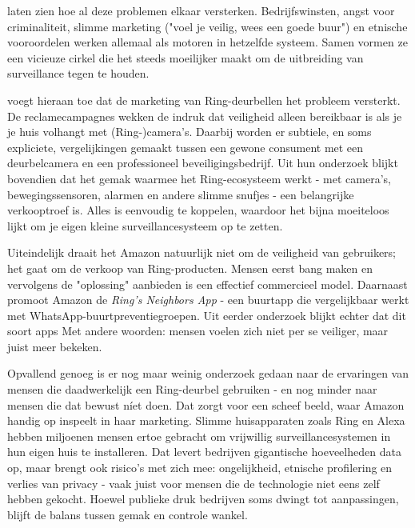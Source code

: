 \documentclass[nonacm,sigconf]{acmart}
\begin{document}
    \noindent \citeauthor{selinger2022amazon} laten zien hoe al deze problemen elkaar versterken.
    Bedrijfswinsten, angst voor criminaliteit, slimme marketing ("voel je veilig, wees een goede buur") en etnische vooroordelen werken allemaal als motoren in hetzelfde systeem.
    Samen vormen ze een vicieuze cirkel die het steeds moeilijker maakt om de uitbreiding van surveillance tegen te houden.

    \noindent \citeauthor{kelly2023ring} voegt hieraan toe dat de marketing van Ring-deurbellen het probleem versterkt.
    De reclamecampagnes wekken de indruk dat veiligheid alleen bereikbaar is als je je huis volhangt met (Ring-)camera's.
    Daarbij worden er subtiele, en soms expliciete, vergelijkingen gemaakt tussen een gewone consument met een deurbelcamera en een professioneel beveiligingsbedrijf.
    Uit hun onderzoek blijkt bovendien dat het gemak waarmee het Ring-ecosysteem werkt - met camera's, bewegingssensoren, alarmen en andere slimme snufjes - een belangrijke verkooptroef is.
    Alles is eenvoudig te koppelen, waardoor het bijna moeiteloos lijkt om je eigen kleine surveillancesysteem op te zetten.

    \noindent Uiteindelijk draait het Amazon natuurlijk niet om de veiligheid van gebruikers; het gaat om de verkoop van Ring-producten.
    Mensen eerst bang maken en vervolgens de "oplossing" aanbieden is een effectief commercieel model.
    Daarnaast promoot Amazon de \textit{Ring's Neighbors App} - een buurtapp die vergelijkbaar werkt met WhatsApp-buurtpreventiegroepen.
    Uit eerder onderzoek blijkt echter dat dit soort apps
    Met andere woorden: mensen voelen zich niet per se veiliger, maar juist meer bekeken.

    \noindent Opvallend genoeg is er nog maar weinig onderzoek gedaan naar de ervaringen van mensen die daadwerkelijk een Ring-deurbel gebruiken - en nog minder naar mensen die dat bewust níet doen.
    Dat zorgt voor een scheef beeld, waar Amazon handig op inspeelt in haar marketing.
    Slimme huisapparaten zoals Ring en Alexa hebben miljoenen mensen ertoe gebracht om vrijwillig surveillancesystemen in hun eigen huis te installeren.
    Dat levert bedrijven gigantische hoeveelheden data op, maar brengt ook risico's met zich mee: ongelijkheid, etnische profilering en verlies van privacy - vaak juist voor mensen die de technologie niet eens zelf hebben gekocht.
    Hoewel publieke druk bedrijven soms dwingt tot aanpassingen, blijft de balans tussen gemak en controle wankel.
\end{document}
